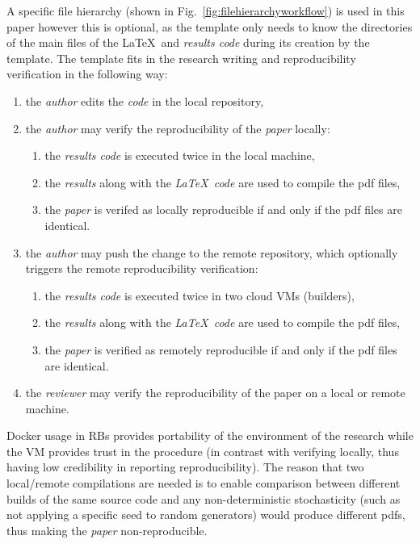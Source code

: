 \documentclass[journal]{IEEEtran}
\begin{document}
A specific file hierarchy (shown in Fig.~\ref{fig:filehierarchyworkflow}) is used in this paper however this is optional, as the template only needs to know the directories of the main files of the \LaTeX\ and \textit{results code} during its creation by the template.
The template fits in the research writing and reproducibility verification in the following way:
\begin{enumerate}
	\item the \textit{author} edits the \textit{code} in the local repository,
	\item the \textit{author} may verify the reproducibility of the \textit{paper} locally:
		\begin{enumerate}
			\item the \textit{results code} is executed twice in the local machine,
			\item the \textit{results} along with the \textit{\LaTeX\ code} are used to compile the pdf files,
			\item the \textit{paper} is verifed as locally reproducible if and only if the pdf files are identical.
		\end{enumerate}
	\item the \textit{author} may push the change to the remote repository, which optionally triggers the remote reproducibility verification:
		\begin{enumerate}
			\item the \textit{results code} is executed twice in two cloud VMs (builders),
			\item the \textit{results} along with the \textit{\LaTeX\ code} are used to compile the pdf files,
			\item the \textit{paper} is verified as remotely reproducible if and only if the pdf files are identical.
		\end{enumerate}
	\item the \textit{reviewer} may verify the reproducibility of the paper on a local or remote machine.
\end{enumerate}

Docker usage in RBs provides portability of the environment of the research while the VM provides trust in the procedure (in contrast with verifying locally, thus having low credibility in reporting reproducibility).
The reason that two local/remote compilations are needed is to enable comparison between different builds of the same source code and any non-deterministic stochasticity (such as not applying a specific seed to random generators) would produce different pdfs, thus making the \textit{paper} non-reproducible.
\end{document}
